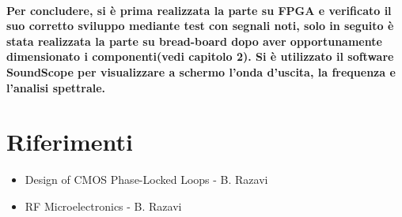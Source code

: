 \documentclass{article}
\begin{document}
\paragraph{Per concludere, si è prima realizzata la parte su FPGA e verificato il suo corretto sviluppo mediante test con segnali noti, solo in seguito è stata realizzata la parte su bread-board dopo aver opportunamente dimensionato i componenti(vedi capitolo 2).
Si è utilizzato il software SoundScope per visualizzare a schermo l'onda d'uscita, la frequenza e l'analisi spettrale.}

\newpage
\section{Riferimenti}
\begin{itemize}
\item Design of CMOS Phase-Locked Loops - B. Razavi
\item RF Microelectronics - B. Razavi
\end{itemize}
\end{document}
